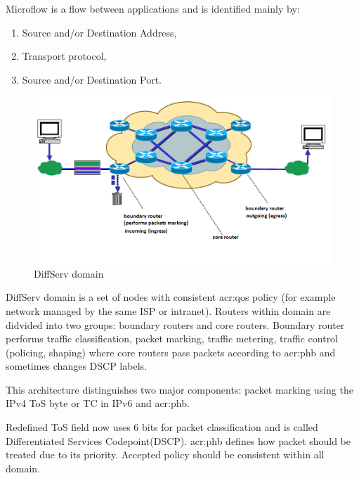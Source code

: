 \documentclass[11pt]{book}
\begin{document}
        Microflow is a flow between applications and is identified mainly by:

        \begin{enumerate}
          \item Source and/or Destination Address,
          \item Transport protocol,
          \item Source and/or Destination Port.
        \end{enumerate}

        \begin{figure}[H]
          \begin{center}
            \includegraphics[width=.7\textwidth]{img/qos/diffserv.png}
          \end{center}
          \caption{DiffServ domain}
        \end{figure} %

        DiffServ domain is a set of nodes with consistent \gls{acr:qos} policy (for example network managed by the same ISP or
        intranet). Routers within domain are didvided into two groups: boundary routers and core routers. Boundary
        router performs traffic classification, packet marking, traffic metering, traffic control (policing, shaping)
        where core routers pass packets according to \gls{acr:phb} and sometimes changes DSCP labels.

        This architecture distinguishes two major components: packet marking using the IPv4 ToS byte or TC in IPv6 and
        \gls{acr:phb}.

        \medskip

        Redefined ToS field now uses 6 bits for packet classification and is called Differentiated Services
        Codepoint(DSCP). \gls{acr:phb} defines how packet should be treated due to its priority. Accepted policy should
        be consistent within all domain.
\end{document}
